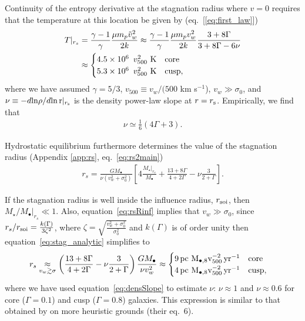 \documentclass[usenatbib,fleqn]{mn2e}
\newcommand{\rs}{r_s}
\newcommand{\pc}{\rm pc}
\newcommand{\Mstar}{M_{\star}}
\newcommand{\Mbh}[1][]{M_{\bullet#1}}
\newcommand{\Mbheight}{M_{\bullet,8}}
\newcommand{\soi}{\rm soi}
\newcommand{\rsoi}{r_{\soi}}
\newcommand{\pyear}{{\rm yr}^{-1}}
\newcommand{\densSlope}{\nu}
\begin{document}
Continuity of the entropy derivative at the stagnation radius where $v = 0$ requires that the temperature at this location be given by (eq.~[\ref{eq:first_law}])
\begin{align}
T|_{r_{s}}& = \frac{\gamma-1}{\gamma}\frac{\mu m_p
  \tilde{v}_{w}^{2}}{2k} \approx \frac{\gamma-1}{\gamma}\frac{\mu
  m_p v_w^2}{2k} \frac{3+8\Gamma}{3+8\Gamma-6\nu} \nonumber\\ 
 &\approx
 \begin{cases}
  4.5\times 10^6\ \, v_{500}^2 \,\,{\rm K} & \text{core} \\
  5.3\times 10^6\ \, v_{500}^2 \,\,{\rm K} & \text{cusp},
 \end{cases}
\label{eq:Tanalytic}
\end{align}
where we have assumed $\gamma=5/3$, $v_{500} \equiv v_{w}/(500$ km
s$^{-1}$), $v_w\gg\sigma_0$,  and $\densSlope \equiv -d{\rm ln}\rho/d{\rm ln\,r}|_{r_{\rm
    s}}$ is the density power-law slope at $r = r_{\rm s}$.
Empirically, we find that
\begin{align}
\densSlope \simeq \frac{1}{6} \left(4 \Gamma+3\right).
\label{eq:densSlope}
\end{align}

Hydrostatic equilibrium furthermore determines the value of the stagnation radius (Appendix \ref{app:rs}, eq.~\ref{eq:rs2main})
\begin{align}
 \rs=\frac{G \Mbh}{\densSlope (v_w^{2}+\sigma_0^2)}\left[4
    \frac{\Mstar|_{\rs}}{\Mbh} +\frac{13+ 8\Gamma}{4+2\Gamma}-\densSlope \frac{3}{2+\Gamma}\right].  
\label{eq:stag_analytic}
\end{align}

If the stagnation radius is well inside the influence radius, $\rsoi$,
then $\Mstar/\Mbh|_{\rs}\ll1$. Also, equation~\eqref{eq:rsRinf}
implies that $v_w\gg \sigma_0$, since
$\rs/\rsoi=\frac{k(\Gamma)}{3\zeta^2}$, where
$\zeta=\sqrt{\frac{v_w^2+\sigma_0^2}{\sigma_0^2}}$ and $k(\Gamma)$ is
of order unity then equation~\eqref{eq:stag_analytic} simplifies to
\begin{align}
  &\rs \underset{v_w \gtrsim \sigma}\approx
  \left(\frac{13+8\Gamma}{4+2\Gamma}-\densSlope
    \frac{3}{2+\Gamma}\right)\frac{G \Mbh}{\densSlope v_w^2}
  \approx \begin{cases} 9
    \, \pc \,\, \Mbheight v_{500}^{-2}\, \pyear& \text{core} \\
    4 \, \pc \,\, \Mbheight v_{500}^{-2} \, \pyear & \text{cusp},
  \end{cases}
  \label{eq:stag_simple}
\end{align}
where we have used equation~\eqref{eq:densSlope} to estimate
$\densSlope$: $\densSlope\approx 1$ and $\densSlope \approx 0.6$ for
core ($\Gamma = 0.1$) and cusp ($\Gamma = 0.8$) galaxies.  This
expression is similar to that obtained by \citet{Volonteri+11} on more
heuristic grounds (their eq.~6). 
\end{document}
